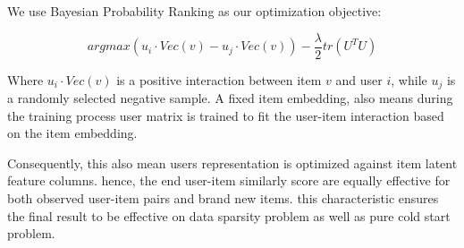 We use Bayesian Probability Ranking as our optimization objective:

\begin{equation}
    arg max (u_i \cdot Vec(v)-u_j \cdot Vec(v)) - \dfrac{\lambda}{2}tr(U^TU)
\end{equation}

Where $u_i \cdot Vec(v)$ is a positive interaction between item $v$ and user $i$, while $u_j$ is a randomly selected negative sample.
A fixed item embedding, also means during the training process user matrix is trained to fit the user-item interaction based on the item embedding. 

Consequently, this also mean users representation is optimized against item latent feature columns. hence, the end user-item similarly score are equally effective for both observed user-item pairs and brand new items. this characteristic ensures the final result to be effective on data sparsity problem as well as pure cold start problem.


